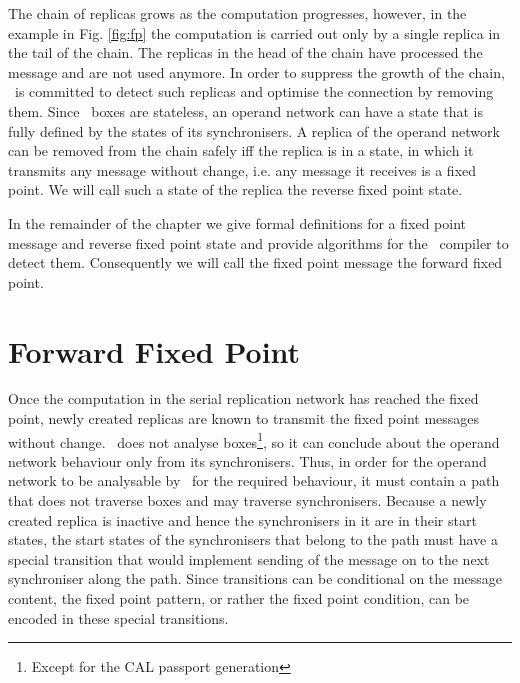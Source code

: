 The chain of replicas grows as the computation progresses, however, in the example in Fig. \ref{fig:fp} the computation is carried out only by a single replica in the tail of the chain. The replicas in the head of the chain have processed the message and are not used anymore. In order to suppress the growth of the chain, \ak\ is committed to detect such replicas and optimise the connection by removing them. Since \ak\ boxes are stateless, an operand network can have a state that is fully defined by the states of its synchronisers. A replica of the operand network can be removed from the chain safely iff the replica is in a state, in which it transmits any message without change, i.e. any message it receives is a fixed point. We will call such a state of the replica the reverse fixed point state.

In the remainder of the chapter we give formal definitions for a fixed point message and reverse fixed point state and provide algorithms for the \ak\ compiler to detect them. Consequently we will call the fixed point message the forward fixed point.


    \section{Forward Fixed Point}
Once the computation in the serial replication network has reached the fixed point, newly created replicas are known to transmit the fixed point messages without change. \ak\ does not analyse boxes\footnote{Except for the CAL passport generation}, so it can conclude about the operand network behaviour only from its synchronisers. Thus, in order for the operand network to be analysable by \ak\ for the required behaviour, it must contain a path that does not traverse boxes and may traverse synchronisers. Because a newly created replica is inactive and hence the synchronisers in it are in their start states, the start states of the synchronisers that belong to the path must have a special transition that would implement sending of the message on to the next synchroniser along the path. Since transitions can be conditional on the message content, the fixed point pattern, or rather the fixed point condition, can be encoded in these special transitions.

